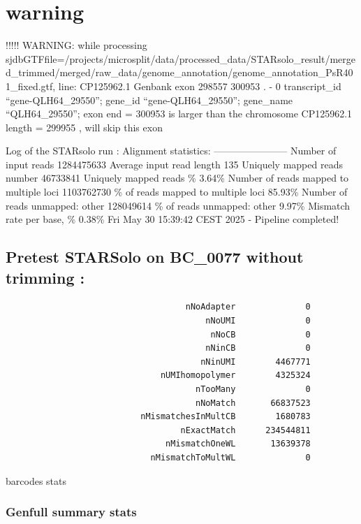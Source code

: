 \documentclass[
  11pt,
  a4paper,
]{report}
\begin{document}
\section{warning}\label{warning}

!!!!! WARNING: while processing
sjdbGTFfile=/projects/microsplit/data/processed\_data/STARsolo\_result/merged\_trimmed/merged/raw\_data/genome\_annotation/genome\_annotation\_PsR401\_fixed.gtf,
line: CP125962.1 Genbank exon 298557 300953 . - 0 transcript\_id
``gene-QLH64\_29550''; gene\_id ``gene-QLH64\_29550''; gene\_name
``QLH64\_29550''; exon end = 300953 is larger than the chromosome
CP125962.1 length = 299955 , will skip this exon

Log of the STARsolo run : Alignment statistics: -----------------------
Number of input reads \textbar{} 1284475633 Average input read length
\textbar{} 135 Uniquely mapped reads number \textbar{} 46733841 Uniquely
mapped reads \% \textbar{} 3.64\% Number of reads mapped to multiple
loci \textbar{} 1103762730 \% of reads mapped to multiple loci
\textbar{} 85.93\% Number of reads unmapped: other \textbar{} 128049614
\% of reads unmapped: other \textbar{} 9.97\% Mismatch rate per base, \%
\textbar{} 0.38\% Fri May 30 15:39:42 CEST 2025 - Pipeline completed!

\subsection{Pretest STARSolo on BC\_0077 without trimming
:}\label{pretest-starsolo-on-bc_0077-without-trimming}

\begin{verbatim}
                                    nNoAdapter              0
                                        nNoUMI              0
                                         nNoCB              0
                                        nNinCB              0
                                       nNinUMI        4467771
                               nUMIhomopolymer        4325324
                                      nTooMany              0
                                      nNoMatch       66837523
                           nMismatchesInMultCB        1680783
                                   nExactMatch      234544811
                                nMismatchOneWL       13639378
                             nMismatchToMultWL              0
\end{verbatim}

barcodes stats

\subsubsection{Genfull summary stats}\label{genfull-summary-stats}
\end{document}
